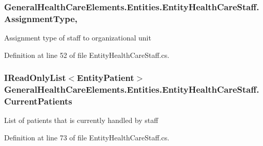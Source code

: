 \subsubsection[{\texorpdfstring{Assignment\+Type}{AssignmentType}}]{ General\+Health\+Care\+Elements.\+Entities.\+Entity\+Health\+Care\+Staff.\+Assignment\+Type\hspace{0.3cm}{\ttfamily [get]}, {\ttfamily [set]}}\hypertarget{class_general_health_care_elements_1_1_entities_1_1_entity_health_care_staff_a851d30cddf0003c22f7d6ef5c157e6c9}{}\label{class_general_health_care_elements_1_1_entities_1_1_entity_health_care_staff_a851d30cddf0003c22f7d6ef5c157e6c9}


Assignment type of staff to organizational unit 



Definition at line 52 of file Entity\+Health\+Care\+Staff.\+cs.

\subsubsection[{\texorpdfstring{Current\+Patients}{CurrentPatients}}]{\setlength{\rightskip}{0pt plus 5cm}I\+Read\+Only\+List$<${\bf Entity\+Patient}$>$ General\+Health\+Care\+Elements.\+Entities.\+Entity\+Health\+Care\+Staff.\+Current\+Patients\hspace{0.3cm}{\ttfamily [get]}}\hypertarget{class_general_health_care_elements_1_1_entities_1_1_entity_health_care_staff_a12a663755022b9c8a4111f57b8f6281b}{}\label{class_general_health_care_elements_1_1_entities_1_1_entity_health_care_staff_a12a663755022b9c8a4111f57b8f6281b}


List of patients that is currently handled by staff 



Definition at line 73 of file Entity\+Health\+Care\+Staff.\+cs.

